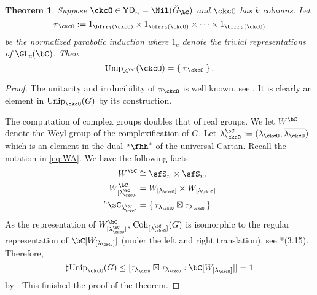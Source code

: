 \documentclass[12pt,a4paper]{amsart}
\numberwithin{equation}{section}
\newtheorem{thm}{Theorem}[section]
\theoremstyle{remark}
\def\Unip{\mathrm{Unip}}
\def\ckGc{\check{G}_{\bC}}
\def\YD{\mathsf{YD}}
\def\lamck{\lambda_\ckcO}
\def\hha{{}^a\fhh}
\def\ahh{\hha}
\def\LC{{}^{\scriptscriptstyle L}\sC}
\def\Coh{\mathrm{Coh}}
\begin{document}
\begin{thm}
Suppose $\ckcO\in \YD_{n} = \Nil(\ckGc)$ and $\ckcO$ has $k$ columns.
Let
\[
 \pi_{\ckcO} := 1_{\bfrr_1(\ckcO)}\times  1_{\bfrr_2(\ckcO)}\times \cdots
 \times 1_{\bfrr_k(\ckcO)}
\]
be the normalized parabolic induction where $1_{c}$ denote the trivial
representations of $\GL_c(\bC)$.
Then
\[
  \Unip_{A^{\bC}}(\ckcO) = \Set{\pi_{\ckcO}}.
\]
\end{thm}
\begin{proof}
  The unitarity and irrducibility of $\pi_{\ckcO}$ is well known, see
  \cite{V.GL}. It is clearly an element in $\Unip_{\ckcO}(G)$ by its construction.

  The computation of complex groups doubles that of real groups.
  We let $\WC$ denote the Weyl group  of the complexification of $G$.
  Let $\lamckC:=(\lamck,\overline{\lamck})$ which is an element in the dual $\ahh^{*}$ of the universal Cartan.
  Recall the notation in \cref{eq:WA}.
  We have the following facts:
  \[
    \begin{split}
      \WC  &\cong  \sfS_{n}\times \sfS_{n}.\\
      \WC_{[\lamckC]} &= W_{[\lamck]}\times W_{[\lamck]}\\
      \LC_{\lamckC} &= \set{\tau_{\lamck}\boxtimes \tau_{\lamck}}\\
    \end{split}
  \]
  As the representation of $\WC_{[\lamckC]}$, $\Coh_{[\lamckC]}(G)$ is isomorphic
  to the regular representation of $ \bC[W_{[\lamck]}]$ (under the left and
  right translation), see \cite{BVUni}*{(3.15)}.
  Therefore,
  \[
    \sharp \Unip_{\ckcO}(G)\leq [\tau_{\lamck}\boxtimes \tau_{\lamck}: \bC[W_{[\lamck]}]] = 1
  \]
  by .
  This finished the proof of the theorem.
\end{proof}




\end{document}
